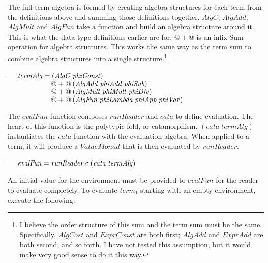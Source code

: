 \documentclass[10pt]{article}
\newlength{\lwidth}\setlength{\lwidth}{4.5cm}
\newlength{\cwidth}\setlength{\cwidth}{8mm} %
\newcommand{\Conid}[1]{\mathit{#1}}
\newcommand{\Varid}[1]{\mathit{#1}}
\begin{document}
The full term algebra is formed by creating algebra structures for
each term from the definitions above and summing those definitions
together.  \ensuremath{\Conid{AlgC}}, \ensuremath{\Conid{AlgAdd}}, \ensuremath{\Conid{AlgMult}} and \ensuremath{\Conid{AlgFun}} take a function
and build an algebra structure around it.  This is what the data type
definitions earlier are for.  \ensuremath{\mathbin{@+@}} is an infix Sum operation for
algebra structures.  This works the same way as the term sum to
combine algebra structures into a single structure.\footnote{I believe
  the order structure of this sum and the term sum must be the same.
  Specifically, \ensuremath{\Conid{AlgCost}} and \ensuremath{\Conid{ExprConst}} are both first; \ensuremath{\Conid{AlgAdd}} and
  \ensuremath{\Conid{ExprAdd}} are both second; and so forth.  I have not tested this
  assumption, but it would make very good sense to do it this way.}

\begin{tabbing}
\qquad\=\hspace{\lwidth}\=\hspace{\cwidth}\=\+\kill
${\hskip1.00em\relax\Varid{termAlg}\mathrel{=}(\Conid{AlgC}\;\Varid{phiConst})}$\\
${\hskip1.00em\relax\phantom{\Varid{termAlg}\mathrel{=}\mbox{}}\mathbin{@+@}(\Conid{AlgAdd}\;\Varid{phiAdd}\;\Varid{phiSub})}$\\
${\hskip1.00em\relax\phantom{\Varid{termAlg}\mathrel{=}\mbox{}}\mathbin{@+@}(\Conid{AlgMult}\;\Varid{phiMult}\;\Varid{phiDiv})}$\\
${\hskip1.00em\relax\phantom{\Varid{termAlg}\mathrel{=}\mbox{}}\mathbin{@+@}(\Conid{AlgFun}\;\Varid{phiLambda}\;\Varid{phiApp}\;\Varid{phiVar})}$
\end{tabbing}
The \ensuremath{\Varid{evalFun}} function composes \ensuremath{\Varid{runReader}} and \ensuremath{\Varid{cata}} to define
evaluation.  The heart of this function is the polytypic fold, or
catamorphism.  \ensuremath{(\Varid{cata}\;\Varid{termAlg})} instantiates the \ensuremath{\Varid{cata}} function with
the evaluation algebra.  When applied to a term, it will produce a
\ensuremath{\Conid{ValueMonad}} that is then evaluated by \ensuremath{\Varid{runReader}}.  

\begin{tabbing}
\qquad\=\hspace{\lwidth}\=\hspace{\cwidth}\=\+\kill
${\hskip1.00em\relax\Varid{evalFun}\mathrel{=}\Varid{runReader}\mathbin{\circ}(\Varid{cata}\;\Varid{termAlg})}$
\end{tabbing}
An initial value for the environment must be provided to \ensuremath{\Varid{evalFun}} for
the reader to evaluate completely.  To evaluate \ensuremath{\Varid{term}_1} starting with
an empty environment, execute the following:
\end{document}
